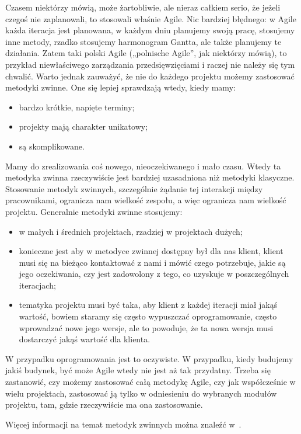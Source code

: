 Czasem niektórzy mówią, może żartobliwie, ale nieraz całkiem serio, że jeżeli czegoś nie zaplanowali,
to stosowali właśnie Agile. Nic bardziej błędnego: w Agile każda iteracja jest planowana,
w każdym dniu planujemy swoją pracę, stosujemy inne metody, rzadko stosujemy harmonogram Gantta,
ale także planujemy te działania. Zatem taki polski Agile („polnische Agile”, jak niektórzy mówią),
to przykład niewłaściwego zarządzania przedsięwzięciami i raczej nie należy się tym chwalić.
Warto jednak zauważyć, że nie do każdego projektu możemy zastosować metodyki zwinne.
One się lepiej sprawdzają wtedy, kiedy mamy:
\begin{itemize}
	\item bardzo krótkie, napięte terminy;
	\item projekty mają charakter unikatowy;
	\item są skomplikowane.
\end{itemize}

Mamy do zrealizowania coś nowego, nieoczekiwanego i mało czasu.
Wtedy ta metodyka zwinna rzeczywiście jest bardziej uzasadniona niż metodyki klasyczne.
Stosowanie metodyk zwinnych, szczególnie żądanie tej interakcji między pracownikami,
ogranicza nam wielkość zespołu, a więc ogranicza nam wielkość projektu.
Generalnie metodyki zwinne stosujemy:
\begin{itemize}
	\item w małych i średnich projektach, rzadziej w projektach dużych;
	\item konieczne jest aby w metodyce zwinnej dostępny był dla nas klient,
	klient musi się na bieżąco kontaktować z nami i mówić czego potrzebuje,
	jakie są jego oczekiwania, czy jest zadowolony z tego, co uzyskuje w poszczególnych iteracjach;
	\item tematyka projektu musi być taka, aby klient z każdej iteracji miał jakąś wartość,
	bowiem staramy się często wypuszczać oprogramowanie, często wprowadzać nowe jego wersje,
	ale to powoduje, że ta nowa wersja musi dostarczyć jakąś wartość dla klienta.
\end{itemize}

W przypadku oprogramowania jest to oczywiste. W przypadku, kiedy budujemy jakiś budynek,
być może Agile wtedy nie jest aż tak przydatny.
Trzeba się zastanowić, czy możemy zastosować całą metodykę Agile,
czy jak współcześnie w wielu projektach, zastosować ją tylko w odniesieniu
do wybranych modułów projektu, tam, gdzie rzeczywiście ma ona zastosowanie.

Więcej informacji na temat metodyk zwinnych można znaleźć w~\cite{Cohen_2006}.

